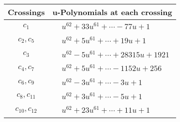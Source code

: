 \documentclass[1p]{elsarticle_modified}
\theoremstyle{definition}
\begin{document}
\begin{tabular}{m{50pt}|m{274pt}}
Crossings & \hspace{64pt}u-Polynomials at each crossing \\
\hline $$\begin{aligned}c_{1}\end{aligned}$$&$\begin{aligned}
&u^{62}+33 u^{61}+\cdots-77 u+1
\end{aligned}$\\
\hline $$\begin{aligned}c_{2},c_{5}\end{aligned}$$&$\begin{aligned}
&u^{62}+5 u^{61}+\cdots+19 u+1
\end{aligned}$\\
\hline $$\begin{aligned}c_{3}\end{aligned}$$&$\begin{aligned}
&u^{62}-5 u^{61}+\cdots+28315 u+1921
\end{aligned}$\\
\hline $$\begin{aligned}c_{4},c_{7}\end{aligned}$$&$\begin{aligned}
&u^{62}+5 u^{61}+\cdots-1152 u+256
\end{aligned}$\\
\hline $$\begin{aligned}c_{6},c_{9}\end{aligned}$$&$\begin{aligned}
&u^{62}-3 u^{61}+\cdots-3 u+1
\end{aligned}$\\
\hline $$\begin{aligned}c_{8},c_{11}\end{aligned}$$&$\begin{aligned}
&u^{62}+3 u^{61}+\cdots-5 u+1
\end{aligned}$\\
\hline $$\begin{aligned}c_{10},c_{12}\end{aligned}$$&$\begin{aligned}
&u^{62}+23 u^{61}+\cdots+11 u+1
\end{aligned}$\\
\hline
\end{tabular}\\~\\
\newpage\renewcommand{\arraystretch}{1}
\end{document}
